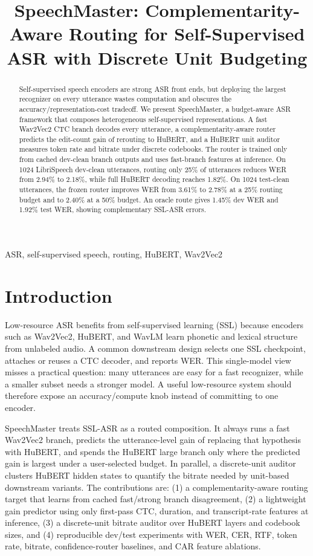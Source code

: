 \documentclass{article}
\title{SpeechMaster: Complementarity-Aware Routing for Self-Supervised ASR with Discrete Unit Budgeting}
\begin{document}
\maketitle

\begin{abstract}
Self-supervised speech encoders are strong ASR front ends, but deploying the
largest recognizer on every utterance wastes computation and obscures the
accuracy/representation-cost tradeoff. We present SpeechMaster, a budget-aware
ASR framework that composes heterogeneous self-supervised representations. A
fast Wav2Vec2 CTC branch decodes every utterance, a complementarity-aware
router predicts the edit-count gain of rerouting to HuBERT, and a HuBERT unit
auditor measures token rate and bitrate under discrete codebooks. The router
is trained only from cached dev-clean branch outputs and uses fast-branch
features at inference. On 1024 LibriSpeech dev-clean utterances, routing only
25\% of utterances reduces WER from 2.94\% to 2.18\%, while full HuBERT
decoding reaches 1.82\%. On 1024 test-clean utterances, the frozen router
improves WER from 3.61\% to 2.78\% at a 25\% routing budget and to 2.40\% at
a 50\% budget. An oracle route gives 1.45\% dev WER and 1.92\% test WER,
showing complementary SSL-ASR errors.
\end{abstract}

\begin{keywords}
ASR, self-supervised speech, routing, HuBERT, Wav2Vec2
\end{keywords}

\section{Introduction}

Low-resource ASR benefits from self-supervised learning (SSL) because encoders
such as Wav2Vec2, HuBERT, and WavLM learn phonetic and lexical structure from
unlabeled audio. A common downstream design selects one SSL checkpoint, attaches
or reuses a CTC decoder, and reports WER. This single-model view misses a
practical question: many utterances are easy for a fast recognizer, while a
smaller subset needs a stronger model. A useful low-resource system should
therefore expose an accuracy/compute knob instead of committing to one encoder.

SpeechMaster treats SSL-ASR as a routed composition. It always runs a fast
Wav2Vec2 branch, predicts the utterance-level gain of replacing that hypothesis
with HuBERT, and spends the HuBERT large branch only where the predicted gain is
largest under a user-selected budget. In parallel, a discrete-unit auditor
clusters HuBERT hidden states to quantify the bitrate needed by unit-based
downstream variants. The contributions are: (1) a complementarity-aware routing
target that learns from cached fast/strong branch disagreement, (2) a lightweight
gain predictor using only first-pass CTC, duration, and transcript-rate features
at inference, (3) a discrete-unit bitrate auditor over HuBERT layers and
codebook sizes, and (4) reproducible dev/test experiments with WER, CER, RTF,
token rate, bitrate, confidence-router baselines, and CAR feature ablations.
\end{document}
